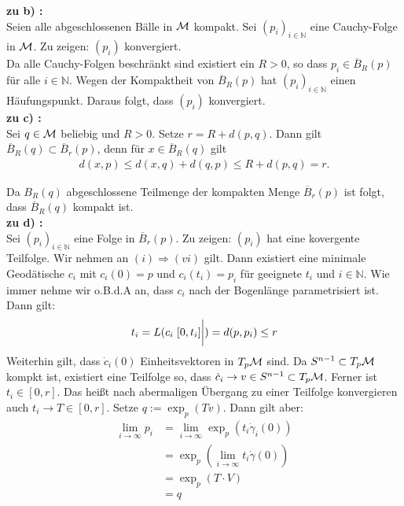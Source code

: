 \begin{bew}
\textbf{zu b) :}\\
Seien alle abgeschlossenen Bälle in $\mathcal{M}$ kompakt. 
Sei $(p_i)_{i \in \mathbb{N}}$ eine Cauchy-Folge in $\mathcal{M}$.
Zu zeigen: $(p_i)$ konvergiert.\\
Da alle Cauchy-Folgen beschränkt sind existiert ein $R > 0$,
so dass $p_i \in \overline{B}_R (p)$ für alle $i \in \mathbb{N}$.
Wegen der Kompaktheit von $\overline{B}_R (p)$ hat 
$(p_i)_{i \in \mathbb{N}}$ einen Häufungspunkt.
Daraus folgt, dass $(p_i)$ konvergiert. \\

\textbf{zu c) :}\\

Sei $q \in \mathcal{M}$ beliebig und $R > 0$.
Setze $r = R + d (p,q)$.
Dann gilt $\overline{B}_R (q) \subset \overline{B}_r (p)$, 
denn für $x \in \overline{B}_R (q)$ gilt
\begin{align*}
d(x, p) \leq d(x, q) + d(q, p) \leq R + d (p,q) = r.
\end{align*}

Da $B_R (q)$ abgeschlossene Teilmenge der kompakten Menge 
$\overline{B}_r (p)$ ist folgt, dass $\overline{B}_R (q)$ kompakt ist.\\

\textbf{zu d) :}\\
Sei $(p_i)_{i \in \mathbb{N}}$ eine Folge in $\overline{B}_r (p)$.
Zu zeigen: $(p_i)$ hat eine kovergente Teilfolge.
Wir nehmen an $(i) \Rightarrow (vi)$ gilt.
Dann existiert eine minimale Geodätische $c_i$ mit $c_i (0) = p$ 
und $c_i (t_i) = p_i$ für geeignete $t_i$ und $i \in \mathbb{N}$.
Wie immer nehme wir o.B.d.A an, dass $c_i$ nach der Bogenlänge parametrisiert ist.
Dann gilt:
\begin{align*}
t_i = L ( c_i \eval{[0, t_i]}) = d(p, p_i ) \leq r
\end{align*}
Weiterhin gilt, dass $\dot{c}_i (0)$ Einheitsvektoren in $T_p \mathcal{M}$ sind.
Da $S^{n-1} \subset T_p \mathcal{M}$ kompkt ist, existiert eine Teilfolge
so, dass $\dot{c}_i \to v \in S^{n-1} \subset T_p \mathcal{M}$.
Ferner ist $t_i \in [0, r]$.
Das heißt nach abermaligen Übergang zu einer Teilfolge konvergieren auch 
$t_i \to T \in [0, r]$.
Setze $q := \exp_p (T v)$.
Dann gilt aber:
\begin{align*}
    \lim_{i\to\infty} p_i &= \lim_{i\to\infty} \exp_p (t_i \dot{\gamma}_i (0))\\
    &= \exp_p (\lim_{i\to\infty} t_i \dot{\gamma} (0)) \\
    &= \exp_p (T \cdot V) \\
    &= q
\end{align*}


\end{bew}
